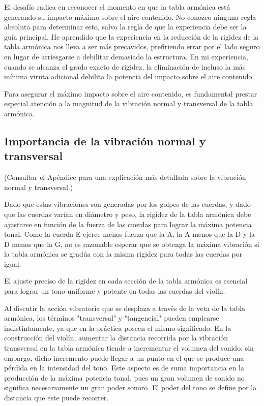 \documentclass[12pt]{book}
\begin{document}
El desafío radica en reconocer el momento en que la tabla armónica está generando su impacto máximo sobre el aire contenido. No conozco ninguna regla absoluta para determinar esto, salvo la regla de que la experiencia debe ser la guía principal. He aprendido que la experiencia en la reducción de la rigidez de la tabla armónica nos lleva a ser más precavidos, prefiriendo errar por el lado seguro en lugar de arriesgarse a debilitar demasiado la estructura. En mi experiencia, cuando se alcanza el grado exacto de rigidez, la eliminación de incluso la más mínima viruta adicional debilita la potencia del impacto sobre el aire contenido.

Para asegurar el máximo impacto sobre el aire contenido, es fundamental prestar especial atención a la magnitud de la vibración normal y transversal de la tabla armónica.

\subsection*{Importancia de la vibración normal y transversal}

(Consultar el Apéndice para una explicación más detallada sobre la vibración normal y transversal.)

Dado que estas vibraciones son generadas por los golpes de las cuerdas, y dado que las cuerdas varían en diámetro y peso, la rigidez de la tabla armónica debe ajustarse en función de la fuerza de las cuerdas para lograr la máxima potencia tonal. Como la cuerda E ejerce menos fuerza que la A, la A menos que la D y la D menos que la G, no es razonable esperar que se obtenga la máxima vibración si la tabla armónica se gradúa con la misma rigidez para todas las cuerdas por igual.

El ajuste preciso de la rigidez en cada sección de la tabla armónica es esencial para lograr un tono uniforme y potente en todas las cuerdas del violín.

Al discutir la acción vibratoria que se desplaza a través de la veta de la tabla armónica, los términos "transversal" y "tangencial" pueden emplearse indistintamente, ya que en la práctica poseen el mismo significado. En la construcción del violín, aumentar la distancia recorrida por la vibración transversal en la tabla armónica tiende a incrementar el volumen del sonido; sin embargo, dicho incremento puede llegar a un punto en el que se produce una pérdida en la intensidad del tono. Este aspecto es de suma importancia en la producción de la máxima potencia tonal, pues un gran volumen de sonido no significa necesariamente un gran poder sonoro. El poder del tono se define por la distancia que este puede recorrer.  
\end{document}
